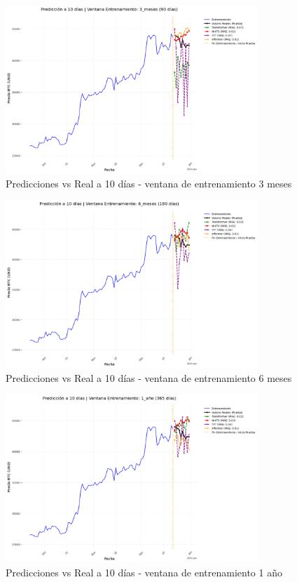\documentclass[12pt]{article}
\begin{document}
\begin{figure}[H]
\centering
\includegraphics[width=0.85\textwidth]{../results/prediccion_10_dias_ventana_3_meses.png}
\caption{Predicciones vs Real a 10 días - ventana de entrenamiento 3 meses}
\label{prediccion_tres_meses}
\end{figure}

\begin{figure}[H]
\centering
\includegraphics[width=0.85\textwidth]{../results/prediccion_10_dias_ventana_6_meses.png}
\caption{Predicciones vs Real a 10 días - ventana de entrenamiento 6 meses}
\label{prediccion_seis_meses}
\end{figure}

\begin{figure}[H]
\centering
\includegraphics[width=0.85\textwidth]{../results/prediccion_10_dias_ventana_1_anio.png}
\caption{Predicciones vs Real a 10 días - ventana de entrenamiento 1 año}
\label{prediccion_un_anio}
\end{figure}
\end{document}
